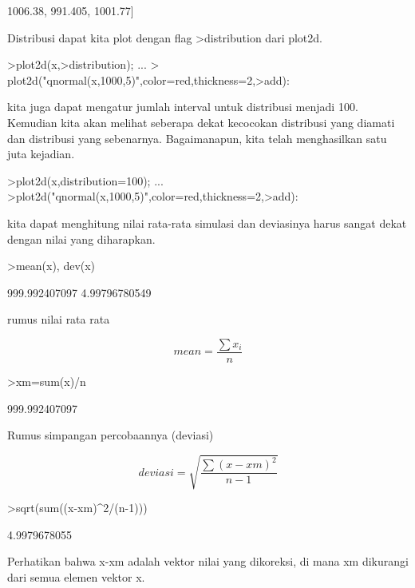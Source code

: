 \documentclass{article}
\begin{document}
\begin{eulernotebook}
\begin{eulercomment}
\begin{eulercomment}
\begin{euleroutput}
  1006.38,  991.405,  1001.77]
\end{euleroutput}
\begin{eulercomment}
Distribusi dapat kita plot dengan flag \textgreater{}distribution dari plot2d.
\end{eulercomment}
\begin{eulerprompt}
>plot2d(x,>distribution);  ...
> plot2d("qnormal(x,1000,5)",color=red,thickness=2,>add):
\end{eulerprompt}
\begin{eulercomment}
kita juga dapat mengatur jumlah interval untuk distribusi menjadi 100.
Kemudian kita akan melihat seberapa dekat kecocokan distribusi yang
diamati dan distribusi yang sebenarnya. Bagaimanapun, kita telah
menghasilkan satu juta kejadian.
\end{eulercomment}
\begin{eulerprompt}
>plot2d(x,distribution=100); ...
>plot2d("qnormal(x,1000,5)",color=red,thickness=2,>add):
\end{eulerprompt}
\begin{eulercomment}
kita dapat menghitung nilai rata-rata simulasi dan deviasinya harus
sangat dekat dengan nilai yang diharapkan.
\end{eulercomment}
\begin{eulerprompt}
>mean(x), dev(x)
\end{eulerprompt}
\begin{euleroutput}
  999.992407097
  4.99796780549
\end{euleroutput}
\begin{eulercomment}
rumus nilai rata rata

\end{eulercomment}
\begin{eulerformula}
\[
mean = \frac{\sum x_i}{n}
\]
\end{eulerformula}
\begin{eulerprompt}
>xm=sum(x)/n
\end{eulerprompt}
\begin{euleroutput}
  999.992407097
\end{euleroutput}
\begin{eulercomment}
Rumus simpangan percobaannya (deviasi)\\
\end{eulercomment}
\begin{eulerformula}
\[
deviasi= \sqrt{\frac{\sum (x - xm)^2}{n-1}}
\]
\end{eulerformula}
\begin{eulerprompt}
>sqrt(sum((x-xm)^2/(n-1)))
\end{eulerprompt}
\begin{euleroutput}
  4.9979678055
\end{euleroutput}
\begin{eulercomment}
Perhatikan bahwa x-xm adalah vektor nilai yang dikoreksi, di mana xm
dikurangi dari semua elemen vektor x.


\end{eulercomment}
\end{eulercomment}
\end{eulercomment}
\end{eulernotebook}
\end{document}
